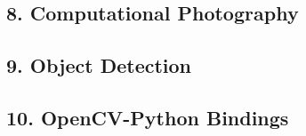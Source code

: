 \documentclass[11pt]{article}
\begin{document}
    \subsection{8. Computational
Photography}\label{computational-photography}

    \subsection{9. Object Detection}\label{object-detection}

    \subsection{10. OpenCV-Python Bindings}\label{opencv-python-bindings}


    
    
    
    
\end{document}
